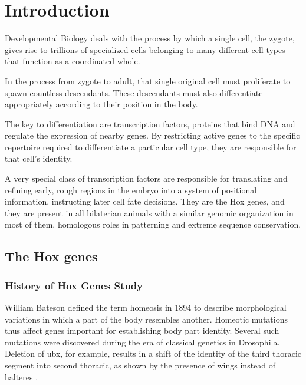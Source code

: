 \chapter{Introduction}
\label{chp:intro}
\thispagestyle{cleared}
\cleardoublepage

Developmental Biology deals with the process by which a single cell, the zygote, gives rise to trillions of specialized cells belonging to many different cell types that function as a coordinated whole.

In the process from zygote to adult, that single original cell must proliferate to spawn countless descendants. These descendants must also differentiate appropriately according to their position in the body. 

The key to differentiation are transcription factors, proteins that bind DNA and regulate the expression of nearby genes. By restricting active genes to the specific repertoire required to differentiate a particular cell type, they are responsible for that cell's identity. 

A very special class of transcription factors are responsible for translating and refining early, rough regions in the embryo into a system of positional information, instructing later cell fate decisions. They are the Hox genes, and they are present in all bilaterian animals with a similar genomic organization in most of them, homologous roles in patterning and extreme sequence conservation.%

\section{The Hox genes}

\subsection{History of Hox Genes Study}

William Bateson defined the term homeosis in 1894 to describe morphological variations in which a part of the body resembles another. Homeotic mutations thus affect genes important for establishing body part identity. Several such mutations were discovered during the era of classical genetics in Drosophila. Deletion of \ac{ubx}, for example, results in a shift of the identity of the third thoracic segment into second thoracic, as shown by the presence of wings instead of halteres \parencite{Morata1981}.


